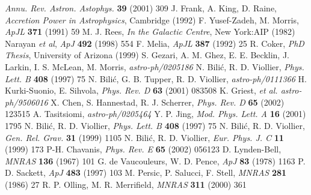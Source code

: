 \begin{thebibliography}{100}
								{\it Annu. Rev. Astron. Astophys.} {\bf 39} (2001) 309
					J. Frank, A. King, D. Raine,
								{\it Accretion Power in Astrophysics}, Cambridge (1992)
				F. Yusef-Zadeh, M. Morris,
								{\it ApJL} {\bf 371} (1991) 59
					M. J. Rees,
								{\it In the Galactic Centre}, New York:AIP (1982)
					Narayan {\it et al},
								{\it ApJ} {\bf 492} (1998) 554
					F. Melia,
								{\it ApJL} {\bf 387} (1992) 25
				R. Coker,
								{\it PhD Thesis}, University of Arizona (1999)
					S. Gezari, A. M. Ghez, E. E. Becklin, J. Larkin, I. S. McLean, M. Morris,
								{\it astro-ph/0205186}
				N. Bili\'{c}, R. D. Viollier,
								{\it Phys. Lett. B} {\bf 408} (1997) 75
					N. Bili\'{c}, G. B. Tupper, R. D. Viollier,
								{\it astro-ph/0111366}
				H. Kurki-Suonio, E. Sihvola,
								{\it Phys. Rev. D} {\bf 63} (2001) 083508
				K. Griest,
								{\it et al. astro-ph/9506016}
				X. Chen, S. Hannestad, R. J. Scherrer,
								{\it Phys. Rev. D} {\bf 65} (2002) 123515
				A. Tasitsiomi,
								{\it astro-ph/0205464}
			Y. P. Jing,
								{\it Mod. Phys. Lett. A} {\bf 16} (2001) 1795
					N. Bili\'{c}, R. D. Viollier,
								{\it Phys. Lett. B} {\bf 408} (1997) 75
					N. Bili\'{c}, R. D. Viollier,
								{\it Gen. Rel. Grav.} {\bf 31} (1999) 1105
					N. Bili\'{c}, R. D. Viollier,
								{\it Eur. Phys. J. C} {\bf 11} (1999) 173
					P-H. Chavanis,
								{\it Phys. Rev. E} {\bf 65} (2002) 056123
				D. Lynden-Bell,
								{\it MNRAS} {\bf 136} (1967) 101
					G. de Vaucouleurs, W. D. Pence,
								{\it ApJ} {\bf 83} (1978) 1163
				P. D. Sackett,
								{\it ApJ} {\bf 483} (1997) 103
					M. Persic, P. Salucci, F. Stell,
								{\it MNRAS} {\bf 281} (1986) 27
					R. P. Olling, M. R. Merrifield,
								{\it MNRAS} {\bf 311} (2000) 361
\end{thebibliography}
